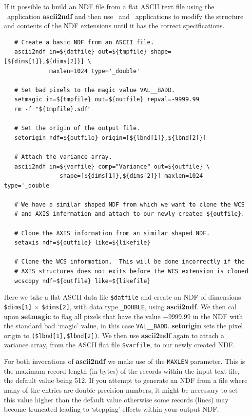 \documentclass[twoside,11pt]{article}
\newcommand{\xref}[3]{#1}
\begin{document}
\begin{\htmlonly}
{If it possible to build an \xref{NDF}{sun33}{} file from a flat ASCII
text file using the \CONVERT\ application
\xref{{\bf ascii2ndf}}{sun55}{ASCII2NDF} and then use \KAPPAref\ and
\DATACUBEref\ applications to modify the structure and contents of the
NDF extensions until it has the correct specifications.

\small\begin{verbatim}
   # Create a basic NDF from an ASCII file.
   ascii2ndf in=${datfile} out=${tmpfile} shape=[${dims[1]},${dims[2]}] \
             maxlen=1024 type='_double'

   # Set bad pixels to the magic value VAL__BADD.
   setmagic in=${tmpfile} out=${outfile} repval=-9999.99 
   rm -f "${tmpfile}.sdf"

   # Set the origin of the output file.
   setorigin ndf=${outfile} origin=[${lbnd[1]},${lbnd[2]}] 

   # Attach the variance array.
   ascii2ndf in=${varfile} comp="Variance" out=${outfile} \
                shape=[${dims[1]},${dims[2]}] maxlen=1024 type='_double' 

   # We have a similar shaped NDF from which we want to clone the WCS
   # and AXIS information and attach to our newly created ${outfile}.
   
   # Clone the AXIS information from an similar shaped NDF.
   setaxis ndf=${outfile} like=${likefile}
   
   # Clone the WCS information.  This will be done incorrectly if the
   # AXIS structures does not exits before the WCS extension is cloned
   wcscopy ndf=${outfile} like=${likefile}
\end{verbatim}\normalsize

Here we take a flat ASCII data file \verb+$datfile+ and create an NDF
of dimensions \verb+$dims[1]+ $\times$ \verb+$dims[2]+, with data type
{\tt \_DOUBLE}, using {\bf ascii2ndf}.  We then cal upon
\xref{{\bf setmagic}}{sun95}{SETMAGIC} to flag all pixels that have the
value $-9999.99$ in the NDF with the \xref{standard bad `magic'
value}{sun95}{se_masking}, in this case {\tt VAL\_\_BADD}.  
\xref{{\bf setorigin}}{sun95}{SETORIGIN} sets the pixel origin 
to \verb+($lbnd[1],$lbnd[2])+.  We then use {\bf ascii2ndf} again to
attach a variance array, from the ASCII flat file \verb+$varfile+, to
our newly created NDF.

For both invocations of {\bf ascii2ndf} we make use of the {\tt MAXLEN}
parameter.  This is the maximum record length (in bytes) of the records
within the input text file, the default value being 512.  If you
attempt to generate an NDF from a file where many of the entries are
double-precision numbers, it might be necessary to set this value
higher than the default value otherwise some records (lines) may
become truncated leading to `stepping' effects within your output
NDF.

}
\end{\htmlonly}
\end{document}
